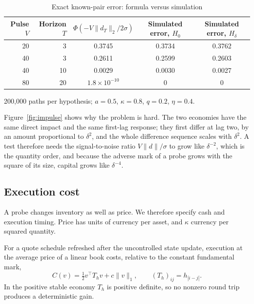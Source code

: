 \begin{table}[t]\centering
\begin{threeparttable}
\caption{Exact known-pair error: formula versus simulation}\label{tab:mcerr}
\begin{tabular}{rrccc}
\toprule
Pulse $V$ & Horizon $T$ & $\Phi(-V\|d_T\|_2/2\sigma)$ & Simulated error, $H_0$ & Simulated error, $H_\delta$\\
\midrule
20 & 3 & 0.3745 & 0.3734 & 0.3762\\
40 & 3 & 0.2611 & 0.2599 & 0.2603\\
40 & 10 & 0.0029 & 0.0030 & 0.0027\\
80 & 20 & $1.8\times10^{-10}$ & 0 & 0\\
\bottomrule
\end{tabular}
\begin{tablenotes}\footnotesize\item 200,000 paths per hypothesis; $a=0.5$, $\kappa=0.8$, $q=0.2$, $\eta=0.4$. \end{tablenotes}
\end{threeparttable}
\end{table}

Figure~\ref{fig:impulse} shows why the problem is hard. The two economies have the same direct impact and the same first-lag response; they first differ at lag two, by an amount proportional to $\delta^2$, and the whole difference sequence scales with $\delta^2$. A test therefore needs the signal-to-noise ratio $V\|d\|/\sigma$ to grow like $\delta^{-2}$, which is the quantity order, and because the adverse mark of a probe grows with the square of its size, capital grows like $\delta^{-4}$.

\subsection{Execution cost}

A probe changes inventory as well as price. We therefore specify cash and execution timing. Price has units of currency per asset, and $\kappa$ currency per squared quantity.

\begin{lemma}\label{lem:toeplitz}
For a quote schedule refreshed after the uncontrolled state update, execution at the average price of a linear book costs, relative to the constant fundamental mark,
\begin{equation}\label{eq:cost}
C(v)=\tfrac12v^\top T_hv+c\|v\|_1,\qquad (T_h)_{ij}=h_{|i-j|}.
\end{equation}
In the positive stable economy $T_h$ is positive definite, so no nonzero round trip produces a deterministic gain.
\end{lemma}

